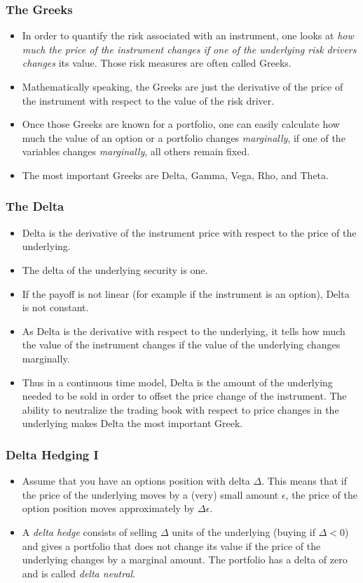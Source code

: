 \begin{frame}[fragile]
\frametitle{The Greeks}
\begin{itemize}
\item In order to quantify the risk associated with an instrument, one looks at
\emph{ how much the price of the instrument changes if one of the underlying
risk drivers changes} its value. Those risk measures are often called
Greeks.
\item Mathematically speaking, the Greeks are just the derivative of the price
of the instrument with respect to the value of the risk driver.
\item Once those Greeks are known for a portfolio, one can easily calculate how
much the value of an option or a portfolio changes \emph{marginally}, if one of
the variables changes \emph{marginally}, all others remain fixed.
\item The most important Greeks are Delta, Gamma, Vega, Rho, and Theta.
\end{itemize}
\end{frame}

\begin{frame}[fragile]
\frametitle{The Delta}
\begin{itemize}
\item Delta is the derivative of the instrument price with respect to the price
of the underlying.
\item The delta of the underlying security is one.
\item If the payoff is not linear (for example if the instrument is an option),
Delta is not constant.
\item As Delta is the derivative with respect to the underlying, it tells how
much the value of the instrument changes if the value of the underlying changes
marginally.
\item Thus in a continuous time model, Delta is the amount of the underlying
needed to be sold in order to offset the price change of the instrument. The
ability to neutralize the trading book with respect to price changes in the
underlying makes Delta the most important Greek.
\end{itemize}
\end{frame}

\begin{frame}[fragile]
\frametitle{Delta Hedging I}
\begin{itemize}
  \item Assume that you have an options position with delta $\Delta$. This means
  that if the price of the underlying moves by a (very) small amount $\epsilon$, the
  price of the option position moves approximately by $\Delta \epsilon$.
  \item A \emph{delta hedge} consists of selling $\Delta$ units of the
  underlying (buying if $\Delta <0$) and gives a portfolio that does not
  change its value if the price of the underlying changes by a marginal amount.
  The portfolio has a delta of zero and is called \emph{delta neutral}.
\end{itemize}
\end{frame}

